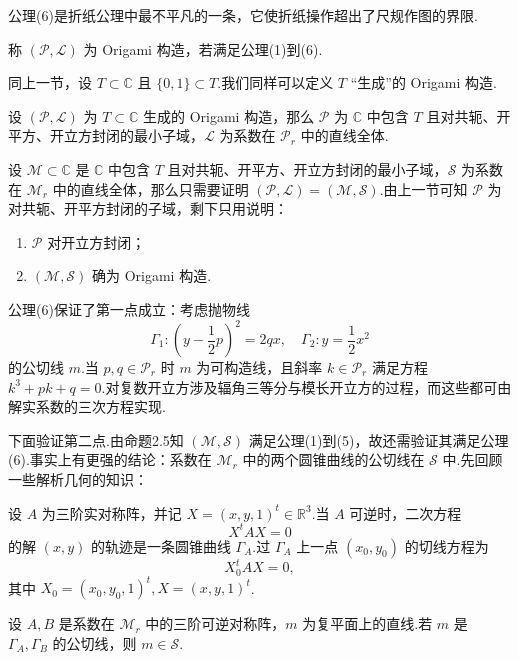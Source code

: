 公理(6)是折纸公理中最不平凡的一条，它使折纸操作超出了尺规作图的界限.

\begin{definition}
    称 $(\mathcal{P},\mathcal{L})$ 为 Origami 构造，若满足公理(1)到(6).
\end{definition}

同上一节，设 $T\subset\mathbb{C}$ 且 $\{0,1\}\subset T$.我们同样可以定义 $T$ “生成”的 Origami 构造.

\begin{theorem}
    设 $(\mathcal{P},\mathcal{L})$ 为 $T\subset\mathbb{C}$ 生成的 Origami 构造，那么 $\mathcal{P}$ 为 $\mathbb{C}$ 中包含 $T$ 且对共轭、开平方、开立方封闭的最小子域，$\mathcal{L}$ 为系数在 $\mathcal{P}_r$ 中的直线全体.
\end{theorem}

设 $\mathcal{M}\subset\mathbb{C}$ 是 $\mathbb{C}$ 中包含 $T$ 且对共轭、开平方、开立方封闭的最小子域，$\mathcal{S}$ 为系数在 $\mathcal{M}_r$ 中的直线全体，那么只需要证明 $(\mathcal{P},\mathcal{L})=(\mathcal{M},\mathcal{S})$.由上一节可知 $\mathcal{P}$ 为对共轭、开平方封闭的子域，剩下只用说明：

\begin{enumerate}[wide,itemindent=2em,label=\bullet]
    \item $\mathcal{P}$ 对开立方封闭；
    \item $(\mathcal{M},\mathcal{S})$ 确为 Origami 构造.
\end{enumerate}

公理(6)保证了第一点成立：考虑抛物线
$$
\Gamma_1:(y-\frac{1}{2}p)^2=2qx,\quad \Gamma_2:y=\frac{1}{2}x^2
$$
的公切线 $m$.当 $p,q\in\mathcal{P}_r$ 时 $m$ 为可构造线，且斜率 $k\in\mathcal{P}_r$ 满足方程 $k^3+pk+q=0$.对复数开立方涉及辐角三等分与模长开立方的过程，而这些都可由解实系数的三次方程实现.

下面验证第二点.由命题2.5知 $(\mathcal{M},\mathcal{S})$ 满足公理(1)到(5)，故还需验证其满足公理(6).事实上有更强的结论：系数在 $\mathcal{M}_r$ 中的两个圆锥曲线的公切线在 $\mathcal{S}$ 中.先回顾一些解析几何的知识：

设 $A$ 为三阶实对称阵，并记 $X=(x,y,1)^t\in\mathbb{R}^3$.当 $A$ 可逆时，二次方程
$$
X^tAX=0
$$
的解 $(x,y)$ 的轨迹是一条圆锥曲线 $\Gamma_A$.过 $\Gamma_A$ 上一点 $(x_0,y_0)$ 的切线方程为
$$
X_0^tAX=0,
$$
其中 $X_0=(x_0,y_0,1)^t,X=(x,y,1)^t$.

\begin{proposition}
    设 $A,B$ 是系数在 $\mathcal{M}_r$ 中的三阶可逆对称阵，$m$ 为复平面上的直线.若 $m$ 是 $\Gamma_A,\Gamma_B$ 的公切线，则 $m\in\mathcal{S}$.
\end{proposition}

